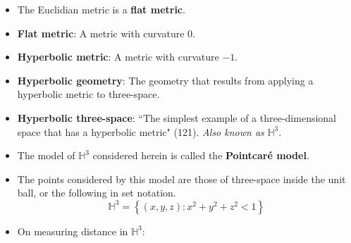 \documentclass[titlepage]{article}
\numberwithin{figure}{section}
\numberwithin{table}{section}
\numberwithin{equation}{section}
\newcommand{\dq}[2]{``#1" (#2).}
\begin{document}
\begin{itemize}
\begin{itemize}
    \end{itemize}
    \item The Euclidian metric is a \textbf{flat metric}.
    \item \textbf{Flat metric}: A metric with curvature 0.
    \item \textbf{Hyperbolic metric}: A metric with curvature $-1$.
    \item \textbf{Hyperbolic geometry}: The geometry that results from applying a hyperbolic metric to three-space.
    \item \textbf{Hyperbolic three-space}: \dq{The simplest example of a three-dimensional space that has a hyperbolic metric}{121} \emph{Also known as} $\mathbb{H}^3$.
    \item The model of $\mathbb{H}^3$ considered herein is called the \textbf{Pointcar\'{e} model}.
    \item The points considered by this model are those of three-space inside the unit ball, or the following in set notation.
    \begin{equation}
        \mathbb{H}^3=\left\{ (x,y,z):x^2+y^2+z^2<1 \right\}
    \end{equation}
    \item On measuring distance in $\mathbb{H}^3$:
    \begin{figure}[h!]
        \centering
\end{figure}
\end{itemize}
\end{document}
